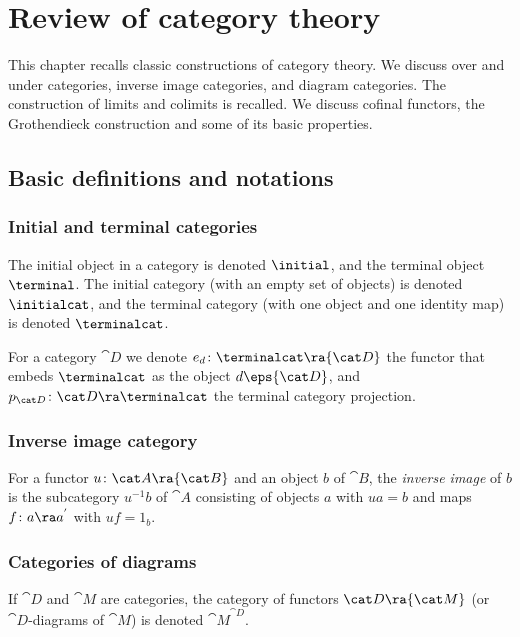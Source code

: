 \chapter{Review of category theory}
\label{chap:constrcat}

This chapter recalls classic constructions of category theory. We discuss over and under categories, inverse image categories, and diagram categories. The construction of limits and colimits is recalled. We discuss cofinal functors, the Grothendieck construction and some of its basic properties.

\section{Basic definitions and notations}
\label{sec:basicdefnotations}

\subsection{Initial and terminal categories}
\label{sec:initterminalcat}
The initial object in a category is denoted $\initial$, and the terminal object $\terminal$. The initial category (with an empty set of objects) is denoted $\initialcat$, and the terminal category (with one object and one identity map) is denoted $\terminalcat$.\index{$\initial$, $\terminal$, $\initialcat$, $\terminalcat$}

For a category ${\cat D}$ we denote $e_d \colon \terminalcat \ra {\cat D}$ the functor that embeds $\terminalcat$ as the object $d \eps {\cat D}$, and $p_{\cat D} \colon {\cat D} \ra \terminalcat$ the terminal category projection.

\subsection{Inverse image category}
\label{sec:catinverseimage}
For a functor $u \colon {\cat A} \ra {\cat B}$ and an object $b$ of ${\cat B}$, the {\it inverse image} of $b$ is the subcategory $u^{-1}b$ of ${\cat A}$ consisting of objects $a$ with $ua = b$ and maps $f \colon a \ra a^{'}$ with $u f = 1_b$.

\subsection{Categories of diagrams}
\label{sec:catdiag}
If ${\cat D}$ and ${\cat M}$ are categories, the category of functors ${\cat D} \ra {\cat M}$ (or ${\cat D}$-diagrams of ${\cat M}$) is denoted ${\cat M}^{\cat D}$. 

